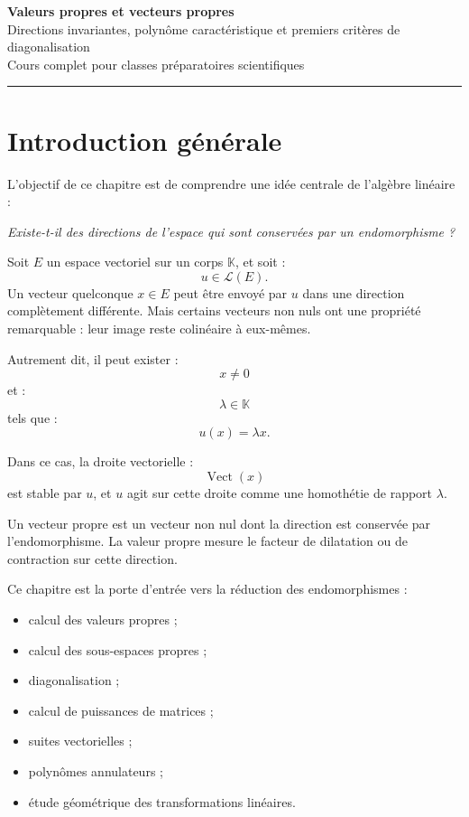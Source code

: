 \documentclass[11pt,a4paper]{article}
\newcommand{\K}{\mathbb K}
\newcommand{\Lcal}{\mathcal L}
\newcommand{\Vect}{\operatorname{Vect}}
\begin{document}
\begin{center}
    {\Huge \textbf{Valeurs propres et vecteurs propres}}\\[2mm]
    {\Large Directions invariantes, polynôme caractéristique et premiers critères de diagonalisation}\\[2mm]
    {\large Cours complet pour classes préparatoires scientifiques}\\[2mm]
    \rule{0.88\linewidth}{0.5pt}
\end{center}

\vspace{0.4cm}

\tableofcontents

\newpage

\section*{Introduction générale}

L'objectif de ce chapitre est de comprendre une idée centrale de l'algèbre linéaire :

\begin{center}
\textit{Existe-t-il des directions de l'espace qui sont conservées par un endomorphisme ?}
\end{center}

Soit \(E\) un espace vectoriel sur un corps \(\K\), et soit :
\[
u\in\Lcal(E).
\]
Un vecteur quelconque \(x\in E\) peut être envoyé par \(u\) dans une direction complètement différente.  
Mais certains vecteurs non nuls ont une propriété remarquable : leur image reste colinéaire à eux-mêmes.

Autrement dit, il peut exister :
\[
x\neq0
\]
et :
\[
\lambda\in\K
\]
tels que :
\[
u(x)=\lambda x.
\]

Dans ce cas, la droite vectorielle :
\[
\Vect(x)
\]
est stable par \(u\), et \(u\) agit sur cette droite comme une homothétie de rapport \(\lambda\).

\begin{retenirbox}
Un vecteur propre est un vecteur non nul dont la direction est conservée par l'endomorphisme.  
La valeur propre mesure le facteur de dilatation ou de contraction sur cette direction.
\end{retenirbox}

Ce chapitre est la porte d'entrée vers la réduction des endomorphismes :
\begin{itemize}
    \item calcul des valeurs propres ;
    \item calcul des sous-espaces propres ;
    \item diagonalisation ;
    \item calcul de puissances de matrices ;
    \item suites vectorielles ;
    \item polynômes annulateurs ;
    \item étude géométrique des transformations linéaires.
\end{itemize}
\end{document}
